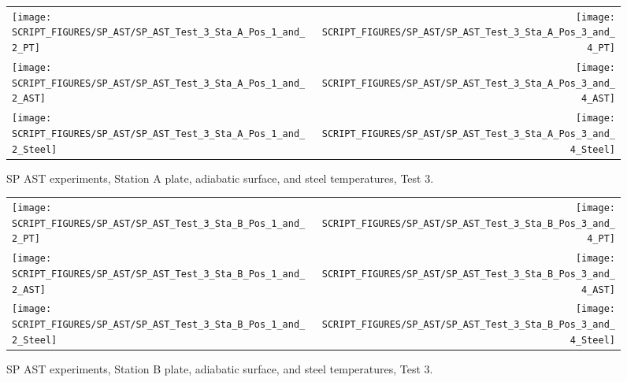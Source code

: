 \begin{figure}[p]
\begin{tabular*}{\textwidth}{l@{\extracolsep{\fill}}r}
\texttt{[image: SCRIPT\_FIGURES/SP\_AST/SP\_AST\_Test\_3\_Sta\_A\_Pos\_1\_and\_2\_PT]} &
\texttt{[image: SCRIPT\_FIGURES/SP\_AST/SP\_AST\_Test\_3\_Sta\_A\_Pos\_3\_and\_4\_PT]} \\
\texttt{[image: SCRIPT\_FIGURES/SP\_AST/SP\_AST\_Test\_3\_Sta\_A\_Pos\_1\_and\_2\_AST]} &
\texttt{[image: SCRIPT\_FIGURES/SP\_AST/SP\_AST\_Test\_3\_Sta\_A\_Pos\_3\_and\_4\_AST]} \\
\texttt{[image: SCRIPT\_FIGURES/SP\_AST/SP\_AST\_Test\_3\_Sta\_A\_Pos\_1\_and\_2\_Steel]} &
\texttt{[image: SCRIPT\_FIGURES/SP\_AST/SP\_AST\_Test\_3\_Sta\_A\_Pos\_3\_and\_4\_Steel]}
\end{tabular*}
\caption[SP AST experiments, Station A plate, adiabatic surface, and steel temperatures, Test 3]{SP AST experiments, Station A plate, adiabatic surface, and steel temperatures, Test 3.}
\label{SP_Test_3_Station_A}
\end{figure}

\begin{figure}[p]
\begin{tabular*}{\textwidth}{l@{\extracolsep{\fill}}r}
\texttt{[image: SCRIPT\_FIGURES/SP\_AST/SP\_AST\_Test\_3\_Sta\_B\_Pos\_1\_and\_2\_PT]} &
\texttt{[image: SCRIPT\_FIGURES/SP\_AST/SP\_AST\_Test\_3\_Sta\_B\_Pos\_3\_and\_4\_PT]} \\
\texttt{[image: SCRIPT\_FIGURES/SP\_AST/SP\_AST\_Test\_3\_Sta\_B\_Pos\_1\_and\_2\_AST]} &
\texttt{[image: SCRIPT\_FIGURES/SP\_AST/SP\_AST\_Test\_3\_Sta\_B\_Pos\_3\_and\_4\_AST]} \\
\texttt{[image: SCRIPT\_FIGURES/SP\_AST/SP\_AST\_Test\_3\_Sta\_B\_Pos\_1\_and\_2\_Steel]} &
\texttt{[image: SCRIPT\_FIGURES/SP\_AST/SP\_AST\_Test\_3\_Sta\_B\_Pos\_3\_and\_4\_Steel]}
\end{tabular*}
\caption[SP AST experiments, Station B plate, adiabatic surface, and steel temperatures, Test 3]{SP AST experiments, Station B plate, adiabatic surface, and steel temperatures, Test 3.}
\label{SP_Test_3_Station_B}
\end{figure}

